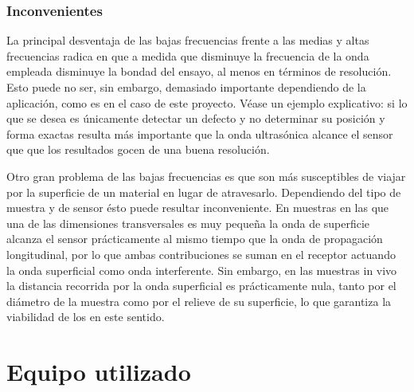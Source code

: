 \subsubsection{Inconvenientes}

La principal desventaja de las bajas frecuencias frente a las medias y
altas frecuencias radica en que a medida que disminuye la frecuencia de la
onda empleada disminuye la bondad del ensayo, al menos en términos de
resolución. Esto puede no ser, sin embargo, demasiado importante
dependiendo de la aplicación, como es en el caso de este proyecto. Véase un
ejemplo explicativo: si lo que se desea es únicamente detectar un defecto y
no determinar su posición y forma exactas resulta más importante que la
onda ultrasónica alcance el sensor que que los resultados gocen de una
buena resolución.

Otro gran problema de las bajas frecuencias es que son más susceptibles de
viajar por la superficie de un material en lugar de atravesarlo.
Dependiendo del tipo de muestra y de sensor ésto puede resultar
inconveniente. En muestras en las que una de las dimensiones transversales
es muy pequeña la onda de superficie alcanza el sensor prácticamente al
mismo tiempo que la onda de propagación longitudinal, por lo que ambas
contribuciones se suman en el receptor actuando la onda superficial como
onda interferente. Sin embargo, en las muestras in vivo la distancia
recorrida por la onda superficial es prácticamente nula, tanto por el
diámetro de la muestra como por el relieve de su superficie, lo que
garantiza la viabilidad de los  en este sentido.


\section{Equipo utilizado}
